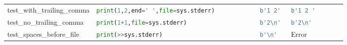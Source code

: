 \begin{table}[]
\begin{tabular}{@{}l|lll@{}}
    test\_with\_trailing\_comma           & \lstinline[language=Python, style=pythonstyle]|print(1,2,end=' ',file=sys.stderr)           | & \lstinline[language=Python, style=pythonstyle]|b'1 2'|                                 & \lstinline[language=Python, style=pythonstyle]|b'1 2 '       |                \\
    test\_no\_trailing\_comma             & \lstinline[language=Python, style=pythonstyle]|print(1+1,file=sys.stderr)                   | & \lstinline[language=Python, style=pythonstyle]|b'2\n' |                 & \lstinline[language=Python, style=pythonstyle]|b'2\n'        | \\
    test\_spaces\_before\_file            & \lstinline[language=Python, style=pythonstyle]|print(>>sys.stderr)| & \lstinline[language=Python, style=pythonstyle]|b'\n'|                   & Error                         \\ \bottomrule
    \end{tabular}
\end{table}